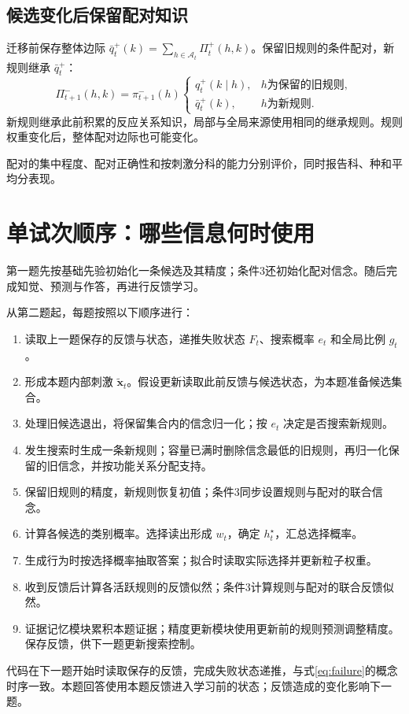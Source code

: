 \documentclass[12pt]{article}
\begin{document}
\subsection{候选变化后保留配对知识}
\label{sec:pairing-transfer}

迁移前保存整体边际 $\bar q_t^+(k)=\sum_{h\in \mathcal A_t}\Pi_t^+(h,k)$。保留旧规则的条件配对，新规则继承 $\bar q_t^+$：
\begin{equation}
\Pi_{t+1}^-(h,k)=\pi_{t+1}^-(h)
\begin{cases}
q_t^+(k\mid h),&h\text{为保留的旧规则},\\
\bar q_t^+(k),&h\text{为新规则}.
\end{cases}
\end{equation}
新规则继承此前积累的反应关系知识，局部与全局来源使用相同的继承规则。规则权重变化后，整体配对边际也可能变化。

配对的集中程度、配对正确性和按刺激分科的能力分别评价，同时报告科、种和平均分表现。

\section{单试次顺序：哪些信息何时使用}
\label{sec:trial}

第一题先按基础先验初始化一条候选及其精度；条件3还初始化配对信念。随后完成知觉、预测与作答，再进行反馈学习。

从第二题起，每题按照以下顺序进行：
\begin{enumerate}
\item 读取上一题保存的反馈与状态，递推失败状态 $F_t$、搜索概率 $e_t$ 和全局比例 $g_t$。
\item 形成本题内部刺激 $\widetilde{\bm x}_t$。假设更新读取此前反馈与候选状态，为本题准备候选集合。
\item 处理旧候选退出，将保留集合内的信念归一化；按 $e_t$ 决定是否搜索新规则。
\item 发生搜索时生成一条新规则；容量已满时删除信念最低的旧规则，再归一化保留的旧信念，并按功能关系分配支持。
\item 保留旧规则的精度，新规则恢复初值；条件3同步设置规则与配对的联合信念。
\item 计算各候选的类别概率。选择读出形成 $w_t$，确定 $h_t^{\star}$，汇总选择概率。
\item 生成行为时按选择概率抽取答案；拟合时读取实际选择并更新粒子权重。
\item 收到反馈后计算各活跃规则的反馈似然；条件3计算规则与配对的联合反馈似然。
\item 证据记忆模块累积本题证据；精度更新模块使用更新前的规则预测调整精度。保存反馈，供下一题更新搜索控制。
\end{enumerate}
代码在下一题开始时读取保存的反馈，完成失败状态递推，与式\eqref{eq:failure}的概念时序一致。本题回答使用本题反馈进入学习前的状态；反馈造成的变化影响下一题。
\end{document}
